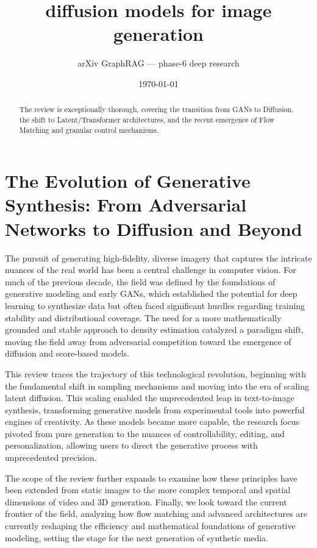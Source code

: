 \documentclass[11pt]{article}
\title{diffusion models for image generation}
\author{arXiv GraphRAG --- phase-6 deep research}
\date{\today}
\begin{document}
\maketitle

\begin{abstract}
The review is exceptionally thorough, covering the transition from GANs to Diffusion, the shift to Latent/Transformer architectures, and the recent emergence of Flow Matching and granular control mechanisms.
\end{abstract}

\section{The Evolution of Generative Synthesis: From Adversarial Networks to Diffusion and Beyond}

The pursuit of generating high-fidelity, diverse imagery that captures the intricate nuances of the real world has been a central challenge in computer vision. For much of the previous decade, the field was defined by the foundations of generative modeling and early GANs, which established the potential for deep learning to synthesize data but often faced significant hurdles regarding training stability and distributional coverage. The need for a more mathematically grounded and stable approach to density estimation catalyzed a paradigm shift, moving the field away from adversarial competition toward the emergence of diffusion and score-based models.

This review traces the trajectory of this technological revolution, beginning with the fundamental shift in sampling mechanisms and moving into the era of scaling latent diffusion. This scaling enabled the unprecedented leap in text-to-image synthesis, transforming generative models from experimental tools into powerful engines of creativity. As these models became more capable, the research focus pivoted from pure generation to the nuances of controllability, editing, and personalization, allowing users to direct the generative process with unprecedented precision.

The scope of the review further expands to examine how these principles have been extended from static images to the more complex temporal and spatial dimensions of video and 3D generation. Finally, we look toward the current frontier of the field, analyzing how flow matching and advanced architectures are currently reshaping the efficiency and mathematical foundations of generative modeling, setting the stage for the next generation of synthetic media.
\end{document}
